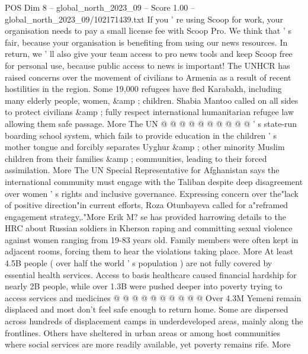 \begin{textsample}{POS Dim 8 – global\_north\_2023\_09 – Score 1.00 – global\_north\_2023\_09/102171439.txt}
If you ' re using Scoop for work, your organisation needs to pay a small license fee with Scoop Pro.
We think that ' s fair, because your organisation is benefiting from using our news resources.
In return, we ' ll also give your team access to pro news tools and keep Scoop free for personal use, because public access to news is important!
The UNHCR has raised concerns over the movement of civilians to Armenia as a result of recent hostilities in the region.
Some 19,000 refugees have fled Karabakh, including many elderly people, women, \&amp ; children.
Shabia Mantoo called on all sides to protect civilians \&amp ; fully respect international humanitarian refugee law allowing them safe passage.
More The UN @ @ @ @ @ @ @ @ @ @ ' s state-run boarding school system, which fails to provide education in the children ' s mother tongue and forcibly separates Uyghur \&amp ; other minority Muslim children from their families \&amp ; communities, leading to their forced assimilation.
More The UN Special Representative for Afghanistan says the international community must engage with the Taliban despite deep disagreement over women ' s rights and inclusive governance.
Expressing concern over the"lack of positive direction"in current efforts, Roza Otunbayeva called for a"reframed engagement strategy,."More Erik M? se has provided harrowing details to the HRC about Russian soldiers in Kherson raping and committing sexual violence against women ranging from 19-83 years old.
Family members were often kept in adjacent rooms, forcing them to hear the violations taking place.
More At least 4.5B people ( over half the world ' s population ) are not fully covered by essential health services.
Access to basis healthcare caused financial hardship for nearly 2B people, while over 1.3B were pushed deeper into poverty trying to access services and medicines @ @ @ @ @ @ @ @ @ @ Over 4.3M Yemeni remain displaced and most don't feel safe enough to return home.
Some are dispersed across hundreds of displacement camps in underdeveloped areas, mainly along the frontlines.
Others have sheltered in urban areas or among host communities where social services are more readily available, yet poverty remains rife.
More

\end{textsample}
